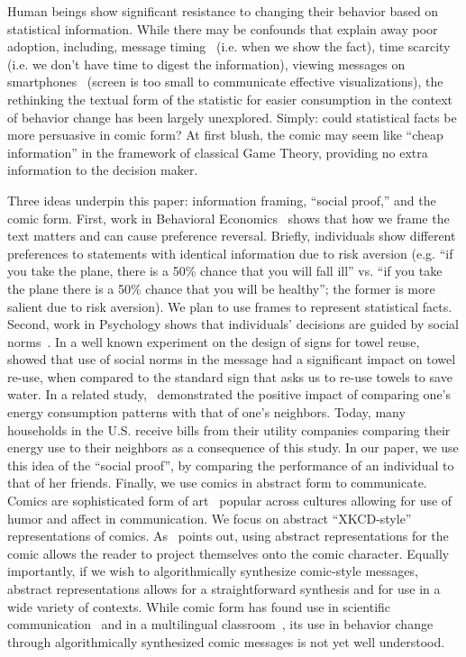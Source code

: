 Human beings show significant resistance to changing their behavior based on statistical information. While there may be confounds that explain away poor adoption, including, message timing~\cite{Fogg2009} (i.e. when we show the fact), time scarcity~\cite{Janssen2016} (i.e. we don't have time to digest the information), viewing messages on smartphones~\cite{Kim2016} (screen is too small to communicate effective visualizations), the rethinking the textual form of the statistic for easier consumption in the context of behavior change has been largely unexplored. Simply: could statistical facts be more persuasive in comic form? At first blush, the comic may seem like ``cheap information'' in the framework of classical Game Theory, providing no extra information to the decision maker.

Three ideas underpin this paper: information framing, ``social proof,'' and the comic form. First, work in Behavioral Economics~\cite{tversky1992advances,tversky1981framing} shows that how we frame the text matters and can cause preference reversal. Briefly, individuals show different preferences to statements with identical information due to risk aversion (e.g. ``if you take the plane, there is a 50\% chance that you will fall ill'' vs. ``if you take the plane there is a 50\% chance that you will be healthy''; the former is more salient due to risk aversion). We plan to use frames to represent statistical facts. Second, work in Psychology shows that individuals' decisions are guided by social norms~\cite{goldstein2008room,schultz2007constructive}. In a well known experiment on the design of signs for towel reuse,~\textcite{goldstein2008room} showed that use of social norms in the message had a significant impact on towel re-use, when compared to the standard sign that asks us to re-use towels to save water. In a related study,~\textcite{schultz2007constructive} demonstrated the positive impact of comparing one's energy consumption patterns with that of one's neighbors. Today, many households in the U.S. receive bills from their utility companies comparing their energy use to their neighbors as a consequence of this study. In our paper, we use this idea of the ``social proof'', by comparing the performance of an individual to that of her friends. Finally, we use comics in abstract form to communicate. Comics are sophisticated form of art~\cite{scott1993understanding} popular across cultures allowing for use of humor and affect in communication. We focus on abstract ``XKCD-style'' ~\cite{munroe2009xkcd}  representations of comics. As~\textcite{scott1993understanding} points out, using abstract representations for the comic allows the reader to project themselves onto the comic character. Equally importantly, if we wish to algorithmically synthesize comic-style messages, abstract representations allows for a straightforward synthesis and for use in a wide variety of contexts. While comic form has found use in scientific communication~\cite{McDermottPB18} and in a multilingual classroom~\cite{cary2004going}, its use in behavior change through algorithmically synthesized comic messages is not yet well understood.

